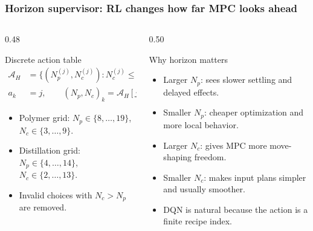 \documentclass[aspectratio=169]{beamer}
\begin{document}
\begin{frame}
\frametitle{\large \textbf{Horizon supervisor: RL changes how far MPC looks ahead}}
\scriptsize

\begin{columns}[T,onlytextwidth]
\begin{column}{0.48\textwidth}
\begin{block}{Discrete action table}
\begin{align*}
\mathcal{A}_H
&=\{(N_p^{(j)},N_c^{(j)}):N_c^{(j)}\le N_p^{(j)}\},\\
a_k&=j,\qquad (N_p,N_c)_k=\mathcal{A}_H[j].
\end{align*}
\vspace{-0.12cm}
\begin{itemize}\justifying
  \setlength\itemsep{0.35ex}
  \item Polymer grid: \(N_p\in\{8,\ldots,19\}\), \(N_c\in\{3,\ldots,9\}\).
  \item Distillation grid: \(N_p\in\{4,\ldots,14\}\), \(N_c\in\{2,\ldots,13\}\).
  \item Invalid choices with \(N_c>N_p\) are removed.
\end{itemize}
\end{block}
\end{column}

\begin{column}{0.50\textwidth}
\begin{block}{Why horizon matters}
\begin{itemize}\justifying
  \setlength\itemsep{0.45ex}
  \item Larger \(N_p\): sees slower settling and delayed effects.
  \item Smaller \(N_p\): cheaper optimization and more local behavior.
  \item Larger \(N_c\): gives MPC more move-shaping freedom.
  \item Smaller \(N_c\): makes input plans simpler and usually smoother.
  \item DQN is natural because the action is a finite recipe index.
\end{itemize}
\end{block}
\end{column}
\end{columns}

\begin{center}
\end{center}


\end{frame}
\end{document}
